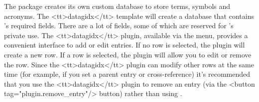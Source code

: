    The  package creates its own custom database 
   to store terms, symbols and acronyms. The <tt>datagidx</tt> template
   will create a database that contains 's required 
   fields. There are a lot of fields, some of which are reserved for
   's private use. The <tt>datagidx</tt> plugin, 
   available via the  menu, provides 
   a convenient interface to add or edit entries. If no row is selected,
   the plugin will create a new row. If a row is selected,
   the plugin will allow you to edit or remove the row. Since the 
   <tt>datagidx</tt> plugin can modify other rows at the same time
   (for example, if you set a parent entry or cross-reference)
   it's recommended that you use the <tt>datagidx</tt> plugin to remove an
   entry (via the <button tag="plugin.remove_entry"/> button) rather than 
   using .

